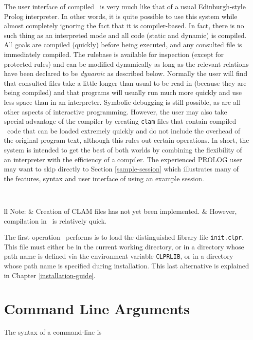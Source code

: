 The user interface of compiled \CLPR\ is very much like that of a usual
Edinburgh-style Prolog interpreter. In other words, it is quite possible to
use this system while almost completely ignoring the fact that it is
compiler-based. 
In fact, there is no such thing as an interpreted mode and all code
(static and dynamic) is compiled.
All goals are compiled (quickly) before being executed, and any consulted file
is immediately compiled. The rulebase is available for inspection (except
for protected rules) and
can be modified dynamically as long as the relevant relations have been
declared to be {\em dynamic} as described below. Normally the user will
find that consulted files take a little longer than usual to be read in
(because they are being compiled) and that programs will usually
run much more quickly and use less space than in an interpreter. Symbolic
debugging is still possible, as are all other aspects of interactive
programming. However, the user may also take special advantage of the compiler
by creating {\tt clam} files that contain compiled \CLPR\ code that can be
loaded extremely quickly and do not include the overhead of the
original program text, although this rules out certain operations.
In short, the system is intended to get the best of both worlds by combining
the flexibility of an interpreter with the efficiency of a compiler.
The experienced PROLOG user may want to skip directly to 
Section \ref{sample-session} which illustrates many of the features,
syntax and user interface of \CLPR{} using an example session.

{
\Large
\ \\
\noindent
\begin{tabular}{ll}
Note: & Creation of CLAM files has not yet been implemented. \nl
	& However, compilation in \CLPR\ is relatively quick.
\end{tabular}
}

The first operation \CLPR\ performs
is to load the distinguished library file
{\tt init.clpr}.  
This file must either be in the current working directory,
or in a directory whose path name is defined via the environment
variable {\tt CLPRLIB}, 
or in a directory whose path name is specified
during installation.  This last alternative is explained 
in Chapter \ref{installation-guide}.

\section{Command Line Arguments}
\label{command-section}
The syntax of a command-line is

